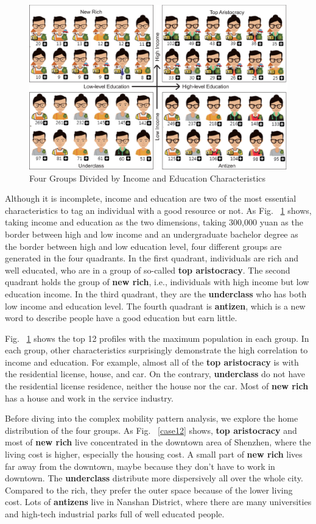 \documentclass{ieeeaccess}
\begin{document}
\begin{figure}[htb!]
 \centering
 \includegraphics[width=\columnwidth]{pictures/case1_1}
 \caption{Four Groups Divided by Income and Education Characteristics}
 \label{case11}
\end{figure}

Although it is incomplete, income and education are two of the most essential characteristics to tag an individual with a good resource or not.
As Fig. ~\ref{case11} shows, taking income and education as the two dimensions, taking 300,000 yuan as the border between high and low income and an undergraduate bachelor degree as the border between high and low education level, four different groups are generated in the four quadrants. In the first quadrant, individuals are rich and well educated, who are in a group of so-called \textbf{top aristocracy}. The second quadrant holds the group of \textbf{new rich}, i.e., individuals with high income but low education income. In the third quadrant, they are the \textbf{underclass} who has both low income and education level. The fourth quadrant is \textbf{antizen}, which is a new word to describe people have a good education but earn little.


Fig. ~\ref{case11} shows the top 12 profiles with the maximum population in each group. In each group, other characteristics surprisingly demonstrate the high correlation to income and education. For example, almost all of the \textbf{top aristocracy} is with the residential license,  house, and car. On the contrary, \textbf{underclass} do not have the residential license residence, neither the house nor the car. Most of \textbf{new rich} has a house and work in the service industry.

Before diving into the complex mobility pattern analysis, we explore the home distribution of the four groups. As Fig. ~\ref{case12} shows, \textbf{top aristocracy} and most of \textbf{new rich} live concentrated in the downtown area of Shenzhen, where the living cost is higher, especially the housing cost. A small part of \textbf{new rich} lives far away from the downtown, maybe because they don't have to work in downtown. The \textbf{underclass} distribute more dispersively all over the whole city. Compared to the rich, they prefer the outer space because of the lower living cost. Lots of \textbf{antizens} live in Nanshan District, where there are many universities and high-tech industrial parks full of well educated people.
\end{document}

